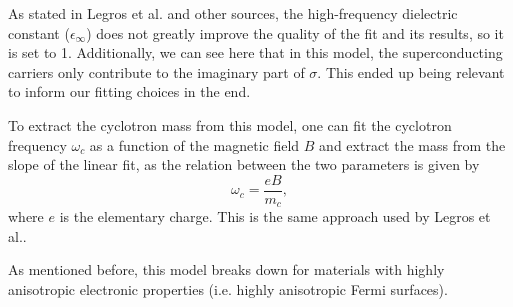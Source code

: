 As stated in Legros et al. and other sources, 
the high-frequency dielectric constant ($\epsilon_\infty$) does not greatly improve the quality of the fit and its results, so it is set to 1.
Additionally, we can see here that in this model, the superconducting carriers only contribute to the imaginary part of $\sigma$. 
This ended up being relevant to inform our fitting choices in the end.

To extract the cyclotron mass from this model, one can fit the cyclotron frequency $\omega_c$ as a
function of the magnetic field $B$ and extract the mass from the slope of the linear fit, as the
relation between the two parameters is given by
\begin{equation}
    \omega_c = \frac{eB}{m_c},
\end{equation}
where $e$ is the elementary charge. This is the same approach used by Legros et al.\cite{legros2022}.

As mentioned before, this model breaks down for materials with highly anisotropic electronic properties
(i.e. highly anisotropic Fermi surfaces).
